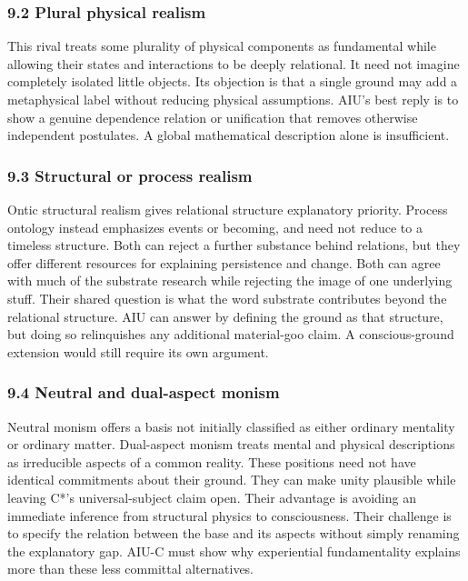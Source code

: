 \documentclass[
  10pt,
  a4paper,
]{article}
\begin{document}
\subsubsection{9.2 Plural physical
realism}\label{plural-physical-realism}

This rival treats some plurality of physical components as fundamental
while allowing their states and interactions to be deeply relational. It
need not imagine completely isolated little objects. Its objection is
that a single ground may add a metaphysical label without reducing
physical assumptions. AIU's best reply is to show a genuine dependence
relation or unification that removes otherwise independent postulates. A
global mathematical description alone is insufficient.

\subsubsection{9.3 Structural or process
realism}\label{structural-or-process-realism}

Ontic structural realism gives relational structure explanatory
priority. Process ontology instead emphasizes events or becoming, and
need not reduce to a timeless structure. Both can reject a further
substance behind relations, but they offer different resources for
explaining persistence and change. Both can agree with much of the
substrate research while rejecting the image of one underlying stuff.
Their shared question is what the word substrate contributes beyond the
relational structure. AIU can answer by defining the ground as that
structure, but doing so relinquishes any additional material-goo claim.
A conscious-ground extension would still require its own argument.

\subsubsection{9.4 Neutral and dual-aspect
monism}\label{neutral-and-dual-aspect-monism}

Neutral monism offers a basis not initially classified as either
ordinary mentality or ordinary matter. Dual-aspect monism treats mental
and physical descriptions as irreducible aspects of a common reality.
These positions need not have identical commitments about their ground.
They can make unity plausible while leaving C*'s universal-subject claim
open. Their advantage is avoiding an immediate inference from structural
physics to consciousness. Their challenge is to specify the relation
between the base and its aspects without simply renaming the explanatory
gap. AIU-C must show why experiential fundamentality explains more than
these less committal alternatives.
\end{document}
